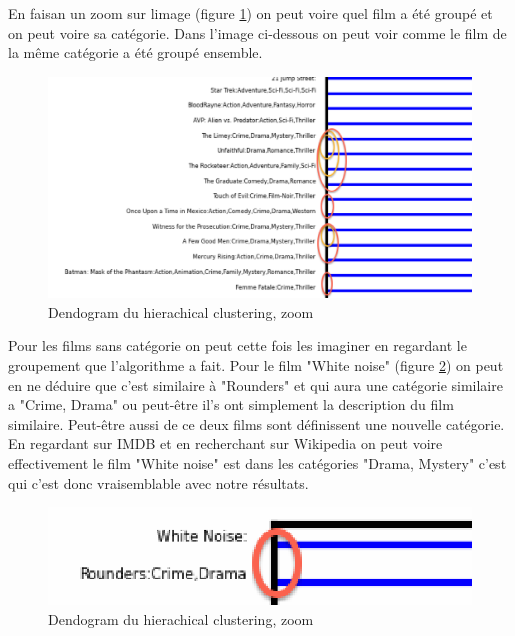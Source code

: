 En faisan un zoom sur limage (figure \ref{zoom}) on peut voire quel film a été groupé et on peut voire sa catégorie. Dans l'image ci-dessous on peut voir comme le film de la même catégorie a été groupé ensemble.

\begin{figure}[h]
  \centering
    \includegraphics[width=1\linewidth]{img/zoom.png}
  \caption{Dendogram du hierachical clustering, zoom}
  \label{zoom}
\end{figure}
\newpage

Pour les films sans catégorie on peut cette fois les imaginer en regardant le groupement que l'algorithme a fait. Pour le film "White noise" (figure \ref{whitenoise}) on peut en ne déduire que c'est similaire à "Rounders" et qui aura une catégorie similaire a "Crime, Drama" ou peut-être il's ont simplement la description du film similaire. Peut-être aussi de ce deux films sont définissent une nouvelle catégorie. En regardant sur IMDB et en recherchant sur Wikipedia on peut voire effectivement le film "White noise" est dans les catégories "Drama, Mystery" c'est qui c'est donc vraisemblable avec notre résultats.

 
\begin{figure}[h]
  \centering
    \includegraphics[width=0.6\linewidth]{img/whitenoise.png}
  \caption{Dendogram du hierachical clustering, zoom}
  \label{whitenoise}
\end{figure}

